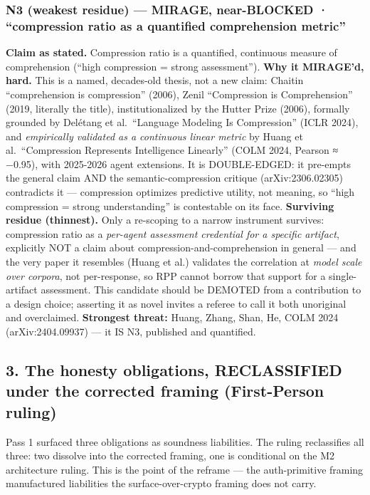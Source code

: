 \documentclass[
  11pt,
]{article}
\begin{document}
\subsubsection{N3 (weakest residue) --- MIRAGE, near-BLOCKED ·
``compression ratio as a quantified comprehension
metric''}\label{n3-weakest-residue-mirage-near-blocked-compression-ratio-as-a-quantified-comprehension-metric}

\textbf{Claim as stated.} Compression ratio is a quantified, continuous
measure of comprehension (``high compression = strong assessment'').
\textbf{Why it MIRAGE'd, hard.} This is a named, decades-old thesis, not
a new claim: Chaitin ``comprehension is compression'' (2006), Zenil
``Compression is Comprehension'' (2019, literally the title),
institutionalized by the Hutter Prize (2006), formally grounded by
Delétang et al.~``Language Modeling Is Compression'' (ICLR 2024), and
\emph{empirically validated as a continuous linear metric} by Huang et
al.~``Compression Represents Intelligence Linearly'' (COLM 2024, Pearson
≈ −0.95), with 2025-2026 agent extensions. It is DOUBLE-EDGED: it
pre-empts the general claim AND the semantic-compression critique
(arXiv:2306.02305) contradicts it --- compression optimizes predictive
utility, not meaning, so ``high compression = strong understanding'' is
contestable on its face. \textbf{Surviving residue (thinnest).} Only a
re-scoping to a narrow instrument survives: compression ratio as a
\emph{per-agent assessment credential for a specific artifact},
explicitly NOT a claim about compression-and-comprehension in general
--- and the very paper it resembles (Huang et al.) validates the
correlation at \emph{model scale over corpora}, not per-response, so RPP
cannot borrow that support for a single-artifact assessment. This
candidate should be DEMOTED from a contribution to a design choice;
asserting it as novel invites a referee to call it both unoriginal and
overclaimed. \textbf{Strongest threat:} Huang, Zhang, Shan, He, COLM
2024 (arXiv:2404.09937) --- it IS N3, published and quantified.

\subsection{3. The honesty obligations, RECLASSIFIED under the corrected
framing (First-Person
ruling)}\label{the-honesty-obligations-reclassified-under-the-corrected-framing-first-person-ruling}

Pass 1 surfaced three obligations as soundness liabilities. The ruling
reclassifies all three: two dissolve into the corrected framing, one is
conditional on the M2 architecture ruling. This is the point of the
reframe --- the auth-primitive framing manufactured liabilities the
surface-over-crypto framing does not carry.
\end{document}
